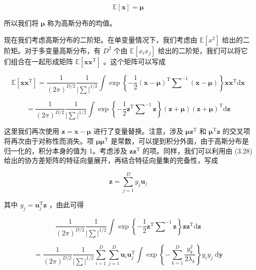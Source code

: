 \documentclass[10pt]{article}
\begin{document}
\[
\mathbb{E}\left\lbrack  \mathbf{x}\right\rbrack   = \mathbf{\mu } \tag{3.42}
\]

所以我们将 \(\mathbf{\mu }\) 称为高斯分布的均值。

现在我们考虑高斯分布的二阶矩。在单变量情况下，我们考虑由 \(\mathbb{E}\left\lbrack  {x}^{2}\right\rbrack\) 给出的二阶矩。对于多变量高斯分布，有 \({D}^{2}\) 个由 \(\mathbb{E}\left\lbrack  {{x}_{i}{x}_{j}}\right\rbrack\) 给出的二阶矩，我们可以将它们组合在一起形成矩阵 \(\mathbb{E}\left\lbrack  {\mathbf{{xx}}}^{\mathrm{T}}\right\rbrack\) 。这个矩阵可以写成

\[
\mathbb{E}\left\lbrack  {\mathbf{{xx}}}^{\mathrm{T}}\right\rbrack   = \frac{1}{{\left( 2\pi \right) }^{D/2}}\frac{1}{{\left| \mathbf{\sum }\right| }^{1/2}}\int \exp \left\{  {-\frac{1}{2}{\left( \mathbf{x} - \mathbf{\mu }\right) }^{\mathrm{T}}{\mathbf{\sum }}^{-1}\left( {\mathbf{x} - \mathbf{\mu }}\right) }\right\}  {\mathbf{{xx}}}^{\mathrm{T}}\mathrm{d}\mathbf{x}
\]

\[
= \frac{1}{{\left( 2\pi \right) }^{D/2}}\frac{1}{{\left| \mathbf{\sum }\right| }^{1/2}}\int \exp \left\{  {-\frac{1}{2}{\mathbf{z}}^{\mathrm{T}}{\mathbf{\sum }}^{-1}\mathbf{z}}\right\}  \left( {\mathbf{z} + \mathbf{\mu }}\right) {\left( \mathbf{z} + \mathbf{\mu }\right) }^{\mathrm{T}}\mathrm{d}\mathbf{z} \tag{3.43}
\]

这里我们再次使用 \(\mathbf{z} = \mathbf{x} - \mathbf{\mu }\) 进行了变量替换。注意，涉及 \(\mathbf{\mu }{\mathbf{z}}^{\mathrm{T}}\) 和 \({\mathbf{\mu }}^{\mathrm{T}}\mathbf{z}\) 的交叉项将再次由于对称性而消失。项 \(\mathbf{\mu }{\mathbf{\mu }}^{\mathrm{T}}\) 是常数，可以提到积分外面，由于高斯分布是归一化的，积分本身的值为 1。考虑涉及 \({\mathbf{{zz}}}^{\mathrm{T}}\) 的项。同样，我们可以利用由 (3.28) 给出的协方差矩阵的特征向量展开，再结合特征向量集的完备性，写成

\[
\mathbf{z} = \mathop{\sum }\limits_{{j = 1}}^{D}{y}_{j}{\mathbf{u}}_{j} \tag{3.44}
\]

其中 \({y}_{j} = {\mathbf{u}}_{j}^{\mathrm{T}}\mathbf{z}\) ，由此可得

\[
\frac{1}{{\left( 2\pi \right) }^{D/2}}\frac{1}{{\left| \mathbf{\sum }\right| }^{1/2}}\int \exp \left\{  {-\frac{1}{2}{\mathbf{z}}^{\mathrm{T}}{\mathbf{\sum }}^{-1}\mathbf{z}}\right\}  \mathbf{z}{\mathbf{z}}^{\mathrm{T}}\mathrm{d}\mathbf{z}
\]

\[
= \frac{1}{{\left( 2\pi \right) }^{D/2}}\frac{1}{{\left| \mathbf{\sum }\right| }^{1/2}}\mathop{\sum }\limits_{{i = 1}}^{D}\mathop{\sum }\limits_{{j = 1}}^{D}{\mathbf{u}}_{i}{\mathbf{u}}_{j}^{\mathrm{T}}\int \exp \left\{  {-\mathop{\sum }\limits_{{k = 1}}^{D}\frac{{y}_{k}^{2}}{2{\lambda }_{k}}}\right\}  {y}_{i}{y}_{j}\mathrm{\;d}\mathbf{y}
\]
\end{document}

